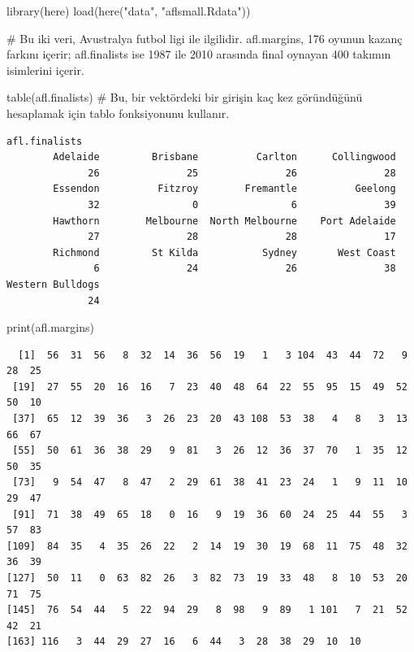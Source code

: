 \documentclass[
  letterpaper,
  DIV=11,
  numbers=noendperiod]{scrartcl}
\newenvironment{Shaded}{\begin{snugshade}}{\end{snugshade}}
\newcommand{\CommentTok}[1]{\textcolor[rgb]{0.37,0.37,0.37}{#1}}
\newcommand{\FunctionTok}[1]{\textcolor[rgb]{0.28,0.35,0.67}{#1}}
\newcommand{\NormalTok}[1]{\textcolor[rgb]{0.00,0.23,0.31}{#1}}
\newcommand{\StringTok}[1]{\textcolor[rgb]{0.13,0.47,0.30}{#1}}
\begin{document}
\begin{Shaded}
\begin{Highlighting}[]
\FunctionTok{library}\NormalTok{(here)}
\FunctionTok{load}\NormalTok{(}\FunctionTok{here}\NormalTok{(}\StringTok{"data"}\NormalTok{, }\StringTok{"aflsmall.Rdata"}\NormalTok{))}

\CommentTok{\# Bu iki veri, Avustralya futbol ligi ile ilgilidir. afl.margins, 176 oyunun kazanç farkını içerir; afl.finalists ise 1987 ile 2010 arasında final oynayan 400 takımın isimlerini içerir. }

\FunctionTok{table}\NormalTok{(afl.finalists) }\CommentTok{\# Bu, bir vektördeki bir girişin kaç kez göründüğünü hesaplamak için tablo fonksiyonunu kullanır.}
\end{Highlighting}
\end{Shaded}

\begin{verbatim}
afl.finalists
        Adelaide         Brisbane          Carlton      Collingwood 
              26               25               26               28 
        Essendon          Fitzroy        Fremantle          Geelong 
              32                0                6               39 
        Hawthorn        Melbourne  North Melbourne    Port Adelaide 
              27               28               28               17 
        Richmond         St Kilda           Sydney       West Coast 
               6               24               26               38 
Western Bulldogs 
              24 
\end{verbatim}

\begin{Shaded}
\begin{Highlighting}[]
\FunctionTok{print}\NormalTok{(afl.margins)}
\end{Highlighting}
\end{Shaded}

\begin{verbatim}
  [1]  56  31  56   8  32  14  36  56  19   1   3 104  43  44  72   9  28  25
 [19]  27  55  20  16  16   7  23  40  48  64  22  55  95  15  49  52  50  10
 [37]  65  12  39  36   3  26  23  20  43 108  53  38   4   8   3  13  66  67
 [55]  50  61  36  38  29   9  81   3  26  12  36  37  70   1  35  12  50  35
 [73]   9  54  47   8  47   2  29  61  38  41  23  24   1   9  11  10  29  47
 [91]  71  38  49  65  18   0  16   9  19  36  60  24  25  44  55   3  57  83
[109]  84  35   4  35  26  22   2  14  19  30  19  68  11  75  48  32  36  39
[127]  50  11   0  63  82  26   3  82  73  19  33  48   8  10  53  20  71  75
[145]  76  54  44   5  22  94  29   8  98   9  89   1 101   7  21  52  42  21
[163] 116   3  44  29  27  16   6  44   3  28  38  29  10  10
\end{verbatim}
\end{document}
